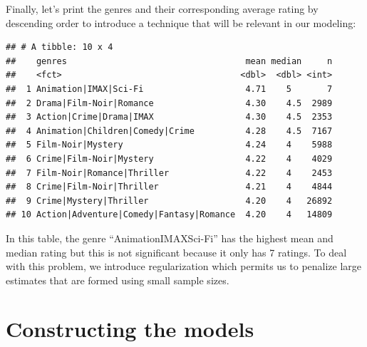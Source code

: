 \documentclass[]{article}
\newenvironment{Shaded}{\begin{snugshade}}{\end{snugshade}}
\newcommand{\KeywordTok}[1]{\textcolor[rgb]{0.13,0.29,0.53}{\textbf{#1}}}
\newcommand{\DataTypeTok}[1]{\textcolor[rgb]{0.13,0.29,0.53}{#1}}
\newcommand{\DecValTok}[1]{\textcolor[rgb]{0.00,0.00,0.81}{#1}}
\newcommand{\StringTok}[1]{\textcolor[rgb]{0.31,0.60,0.02}{#1}}
\newcommand{\OperatorTok}[1]{\textcolor[rgb]{0.81,0.36,0.00}{\textbf{#1}}}
\newcommand{\NormalTok}[1]{#1}
\begin{document}
Finally, let's print the genres and their corresponding average rating
by descending order to introduce a technique that will be relevant in
our modeling:

\begin{Shaded}
\end{Shaded}

\begin{verbatim}
## # A tibble: 10 x 4
##    genres                                   mean median     n
##    <fct>                                   <dbl>  <dbl> <int>
##  1 Animation|IMAX|Sci-Fi                    4.71    5       7
##  2 Drama|Film-Noir|Romance                  4.30    4.5  2989
##  3 Action|Crime|Drama|IMAX                  4.30    4.5  2353
##  4 Animation|Children|Comedy|Crime          4.28    4.5  7167
##  5 Film-Noir|Mystery                        4.24    4    5988
##  6 Crime|Film-Noir|Mystery                  4.22    4    4029
##  7 Film-Noir|Romance|Thriller               4.22    4    2453
##  8 Crime|Film-Noir|Thriller                 4.21    4    4844
##  9 Crime|Mystery|Thriller                   4.20    4   26892
## 10 Action|Adventure|Comedy|Fantasy|Romance  4.20    4   14809
\end{verbatim}

In this table, the genre ``Animation\textbar{}IMAX\textbar{}Sci-Fi'' has
the highest mean and median rating but this is not significant because
it only has 7 ratings. To deal with this problem, we introduce
regularization which permits us to penalize large estimates that are
formed using small sample sizes.

\section{Constructing the models}\label{constructing-the-models}
\end{document}
